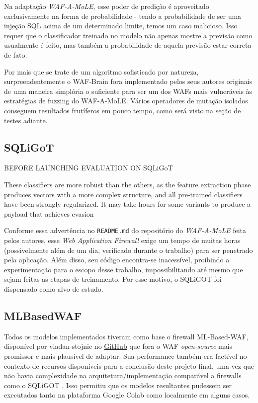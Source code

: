 Na adaptação \textit{WAF-A-MoLE}, esse poder de predição é aproveitado exclusivamente na forma de probabilidade - tendo a probabilidade de ser uma injeção SQL acima de um determinado limite, temos um caso malicioso. Isso requer que o classificador treinado no modelo não apenas mostre a previsão como usualmente é feito, mas também a probabilidade de aquela previsão estar correta de fato.

Por mais que se trate de um algoritmo sofisticado por natureza, surpreendentemente o WAF-Brain fora implementado pelos seus autores originais de uma maneira simplória o suficiente para ser um dos WAFs mais vulneráveis às estratégias de fuzzing do WAF-A-MoLE. Vários operadores de mutação isolados conseguem resultados frutíferos em pouco tempo, como será visto na seção de testes adiante.

\subsection{SQLiGoT}

\begin{citacao}[english]
BEFORE LAUNCHING EVALUATION ON SQLiGoT

These classifiers are more robust than the others, as the feature extraction phase produces vectors with a more complex structure, and all pre-trained classifiers have been strongly regularized. It may take hours for some variants to produce a payload that achieves evasion
\end{citacao}
\bigskip

Conforme essa advertência no \verb+README.md+ do repositório do \textit{WAF-A-MoLE} feita pelos autores, esse \textit{Web Application Firewall} exige um tempo de muitas horas (possivelmente além de um dia, verificado durante o trabalho) para ser penetrado pela aplicação. Além disso, seu código encontra-se inacessível, proibindo a experimentação para o escopo desse trabalho, impossibilitando até mesmo que sejam feitas as etapas de treinamento. Por esse motivo, o SQLiGOT \cite{kar2016sqligot} foi dispensado como alvo de estudo.

\subsection{MLBasedWAF}
Todos os modelos implementados tiveram como base o firewall ML-Based-WAF, disponível por vladan-stojnic no \href{https://github.com/vladan-stojnic/ML-based-WAF}{GitHub} \cite{ml_based_waf} que fora o WAF \textit{open-source} mais promissor e mais plausível de adaptar. Sua performance também era factível no contexto de recursos disponíveis para a conclusão deste projeto final, uma vez que não havia complexidade na arquitetura/implementação comparável a firewalls como o SQLiGOT \cite{kar2016sqligot}. Isso permitiu que os modelos resultantes pudessem ser executados tanto na plataforma Google Colab como localmente em alguns casos.

